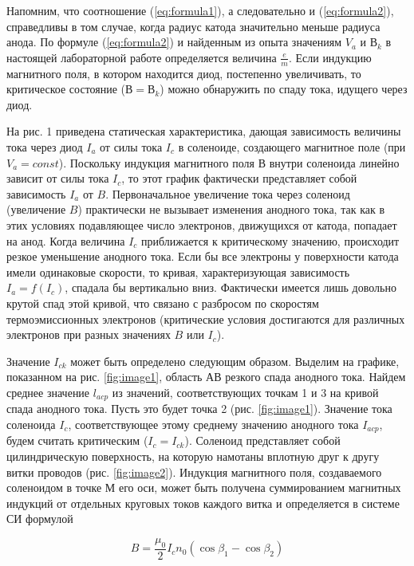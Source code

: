 Напомним, что соотношение (\ref{eq:formula1}), а следовательно и (\ref{eq:formula2}), справедливы в том случае, когда радиус катода значительно меньше радиуса анода. По формуле (\ref{eq:formula2}) и найденным из опыта значениям $V_a$ и $В_k$ в настоящей лабораторной работе определяется величина $\frac{e}{m}$. Если индукцию магнитного поля, в котором находится диод, постепенно увеличивать, то критическое состояние ($В = В_k$) можно обнаружить по спаду тока, идущего через диод.

На рис. 1 приведена статическая характеристика, дающая зависимость величины тока через диод $I_a$ от силы тока $I_c$ в соленоиде, создающего магнитное поле (при $V_a = const$). Поскольку индукция магнитного поля В внутри соленоида линейно зависит от силы тока $I_c$, то этот график фактически представляет собой зависимость $I_a$ от $B$. Первоначальное увеличение тока через соленоид (увеличение $B$) практически не вызывает изменения анодного тока, так как в этих условиях подавляющее число электронов, движущихся от катода, попадает на анод. Когда величина $I_c$ приближается к критическому значению, происходит резкое уменьшение анодного тока. Если бы все электроны у поверхности катода имели одинаковые скорости, то кривая, характеризующая зависимость $I_a = f(I_c)$, спадала бы вертикально вниз. Фактически имеется лишь довольно крутой спад этой кривой, что связано с разбросом по скоростям термоэмиссионных электронов (критические условия достигаются для различных электронов при разных значениях $B$ или $I_c$).

Значение $I_{ck}$ может быть определено следующим образом. Выделим на графике, показанном на рис. \ref{fig:image1}, область АВ резкого спада анодного тока. Найдем среднее значение $l_{acp}$ из значений, соответствующих точкам 1 и 3 на кривой спада анодного тока. Пусть это будет точка 2 (рис. \ref{fig:image1}). Значение тока соленоида $I_c$, соответствующее этому среднему значению анодного тока $I_{acp}$, будем считать критическим ($I_c=I_{ck}$). Соленоид представляет собой цилиндрическую поверхность, на которую намотаны вплотную друг к другу витки проводов (рис. \ref{fig:image2}). Индукция магнитного поля, создаваемого соленоидом в точке М его оси, может быть получена суммированием магнитных индукций от отдельных круговых токов каждого витка и определяется в системе СИ формулой


\begin{equation}
    B = \frac{\mu _0}{2} I_c n_0 (\cos{\beta _1} - \cos{\beta _2})
    \label{eq:formula3}
\end{equation}

